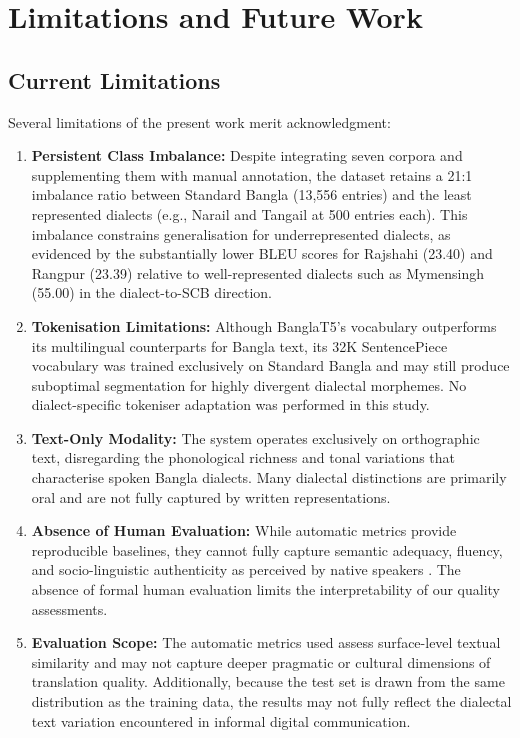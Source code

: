 \documentclass[12pt,a4paper]{article}
\begin{document}
\section{Limitations and Future Work}

\subsection{Current Limitations}
Several limitations of the present work merit acknowledgment:

\begin{enumerate}[leftmargin=*]
    \item \textbf{Persistent Class Imbalance:} Despite integrating seven corpora and supplementing them with manual annotation, the dataset retains a 21:1 imbalance ratio between Standard Bangla (13,556 entries) and the least represented dialects (e.g., Narail and Tangail at 500 entries each). This imbalance constrains generalisation for underrepresented dialects, as evidenced by the substantially lower BLEU scores for Rajshahi (23.40) and Rangpur (23.39) relative to well-represented dialects such as Mymensingh (55.00) in the dialect-to-SCB direction.
    \item \textbf{Tokenisation Limitations:} Although BanglaT5's vocabulary outperforms its multilingual counterparts for Bangla text, its 32K SentencePiece vocabulary was trained exclusively on Standard Bangla and may still produce suboptimal segmentation for highly divergent dialectal morphemes. No dialect-specific tokeniser adaptation was performed in this study.
    \item \textbf{Text-Only Modality:} The system operates exclusively on orthographic text, disregarding the phonological richness and tonal variations that characterise spoken Bangla dialects. Many dialectal distinctions are primarily oral and are not fully captured by written representations.
    \item \textbf{Absence of Human Evaluation:} While automatic metrics provide reproducible baselines, they cannot fully capture semantic adequacy, fluency, and socio-linguistic authenticity as perceived by native speakers \cite{mathur-etal-2020-tangled}. The absence of formal human evaluation limits the interpretability of our quality assessments.
    \item \textbf{Evaluation Scope:} The automatic metrics used assess surface-level textual similarity and may not capture deeper pragmatic or cultural dimensions of translation quality. Additionally, because the test set is drawn from the same distribution as the training data, the results may not fully reflect the dialectal text variation encountered in informal digital communication.
\end{enumerate}
\end{document}
